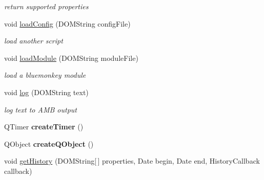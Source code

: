\begin{DoxyCompactItemize}
\begin{DoxyCompactList}\small\item\em return supported properties \end{DoxyCompactList}\item 
\hypertarget{interfaceBluemonkey_a2d71b5b1d9f27674904a0de351fb6c6a}{void \hyperlink{interfaceBluemonkey_a2d71b5b1d9f27674904a0de351fb6c6a}{load\+Config} (D\+O\+M\+String config\+File)}\label{interfaceBluemonkey_a2d71b5b1d9f27674904a0de351fb6c6a}

\begin{DoxyCompactList}\small\item\em load another script \end{DoxyCompactList}\item 
\hypertarget{interfaceBluemonkey_a7fd8d2a4db3a7bb18435dbb51925a68e}{void \hyperlink{interfaceBluemonkey_a7fd8d2a4db3a7bb18435dbb51925a68e}{load\+Module} (D\+O\+M\+String module\+File)}\label{interfaceBluemonkey_a7fd8d2a4db3a7bb18435dbb51925a68e}

\begin{DoxyCompactList}\small\item\em load a bluemonkey module \end{DoxyCompactList}\item 
\hypertarget{interfaceBluemonkey_a54c2790797dcad11ecf1d378c8ff2572}{void \hyperlink{interfaceBluemonkey_a54c2790797dcad11ecf1d378c8ff2572}{log} (D\+O\+M\+String text)}\label{interfaceBluemonkey_a54c2790797dcad11ecf1d378c8ff2572}

\begin{DoxyCompactList}\small\item\em log text to A\+M\+B output \end{DoxyCompactList}\item 
\hypertarget{interfaceBluemonkey_a09d7508ea9d852445ad63cdcb1ed2b4e}{Q\+Timer {\bfseries create\+Timer} ()}\label{interfaceBluemonkey_a09d7508ea9d852445ad63cdcb1ed2b4e}

\item 
\hypertarget{interfaceBluemonkey_af18c01a9c78af1e355eba74a169de9e8}{Q\+Object {\bfseries create\+Q\+Object} ()}\label{interfaceBluemonkey_af18c01a9c78af1e355eba74a169de9e8}

\item 
\hypertarget{interfaceBluemonkey_a5ba5df49c7956d8001ce1d5f2167a788}{void \hyperlink{interfaceBluemonkey_a5ba5df49c7956d8001ce1d5f2167a788}{get\+History} (D\+O\+M\+String\mbox{[}$\,$\mbox{]} properties, Date begin, Date end, History\+Callback callback)}\label{interfaceBluemonkey_a5ba5df49c7956d8001ce1d5f2167a788}


\end{DoxyCompactItemize}
